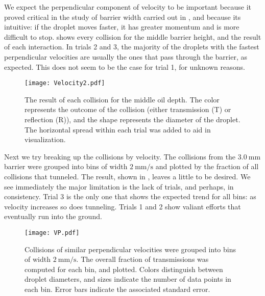 We expect the perpendicular component of velocity to be important because it proved critical in the study of barrier width carried out in , and because its intuitive: if the droplet moves faster, it has greater momentum and is more difficult to stop.  shows every collision for the middle barrier height, and the result of each interaction. In trials 2 and 3, the majority of the droplets with the fastest perpendicular velocities are usually the ones that pass through the barrier, as expected. This does not seem to be the case for trial 1, for unknown reasons. 

\begin{figure}[h!]
	\centering
	\texttt{[image: Velocity2.pdf]}
	\caption{The result of each collision for the middle oil depth. The color represents the outcome of the collision (either transmission (T) or reflection (R)), and the shape represents the diameter of the droplet. The horizontal spread within each trial was added to aid in visualization.}
	\label{vel}
\end{figure}

Next we try breaking up the collisions by velocity. The collisions from the $3.0~\mathrm{mm}$ barrier were grouped into bins of width $2~\mathrm{mm/s}$ and plotted by the fraction of all collisions that tunneled. The result, shown in , leaves a little to be desired. We see immediately the major limitation is the lack of trials, and perhaps, in consistency. Trial 3 is the only one that shows the expected trend for all bins: as velocity increases so does tunneling. Trials 1 and 2 show valiant efforts that eventually run into the ground. 

\begin{figure}[h!]
	\centering
	\texttt{[image: VP.pdf]}
	\caption{Collisions of similar perpendicular velocities were grouped into bins of width $2~\mathrm{mm/s}$. The overall fraction of transmissions was computed for each bin, and plotted. Colors distinguish between droplet diameters, and sizes indicate the number of data points in each bin. Error bars indicate the associated standard error. }
	\label{VP}
\end{figure}

